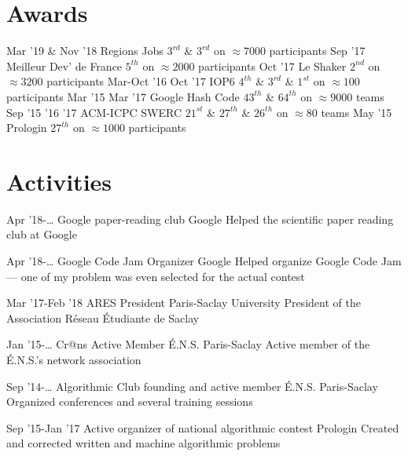\documentclass[letterpaper]{twentysecondcv} %
\begin{document}
\section{Awards}
\begin{twentymedium}
   \twentyitemmedium
	{Mar '19 \& Nov '18}
	{Regions Jobs}
	{$3^{rd}$ \& $3^{rd}$ on $\approx 7000$ participants}
   \twentyitemmedium
    	{Sep '17}
	{Meilleur Dev' de France}
        {$5^{th}$ on $\approx 2000$ participants}
   \twentyitemmedium
    	{Oct '17}
	{Le Shaker}
        {$2^{nd}$ on $\approx 3200$ participants}
   \twentyitemmedium
	{Mar-Oct '16 Oct '17}
        {IOP6}
	{$4^{th}$ \& $3^{rd}$ \& $1^{st}$ on $\approx 100$ participants}
    \twentyitemmedium
    	{Mar '15 Mar '17}
        {Google Hash Code}
        {$43^{th}$ \& $64^{th}$ on $\approx 9000$ teams}
   \twentyitemmedium
	{Sep '15 '16 '17}
        {ACM-ICPC SWERC}
	{$21^{st}$  \& $27^{th}$ \& $26^{th}$ on $\approx 80$ teams}
   \twentyitemmedium
    	{May '15}
        {Prologin}
        {$27^{th}$ on $\approx 1000$ participants}
   
\end{twentymedium}

\section{Activities}

\begin{twenty} %

    \twentyitem
	{Apr '18-…}
        {Google paper-reading club}
        {Google}
        {}
        {Helped the scientific paper reading club at Google}

    \twentyitem
	{Apr '18-…}
        {Google Code Jam Organizer}
        {Google}
        {}
        {Helped organize Google Code Jam — one of my problem was even selected for the actual contest}

    \twentyitem
	{Mar '17-Feb '18}
        {ARES President}
        {Paris-Saclay University}
        {}
        {President of the Association Réseau Étudiante de Saclay}

    \twentyitem
    	{Jan '15-…}
        {Cr@ns Active Member}
        {É.N.S. Paris-Saclay}
        {}
        {Active member of the É.N.S.'s network association}
        
    \twentyitem
   	{Sep '14-…}
        {Algorithmic Club founding and active member}
        {É.N.S. Paris-Saclay}
        {}
        {Organized conferences and several training sessions}
        
     \twentyitem
   	{Sep '15-Jan '17}
        {Active organizer of national algorithmic contest}
        {Prologin}
        {}
        {Created and corrected written and machine algorithmic problems}
        
        
\end{twenty}
\end{document}
